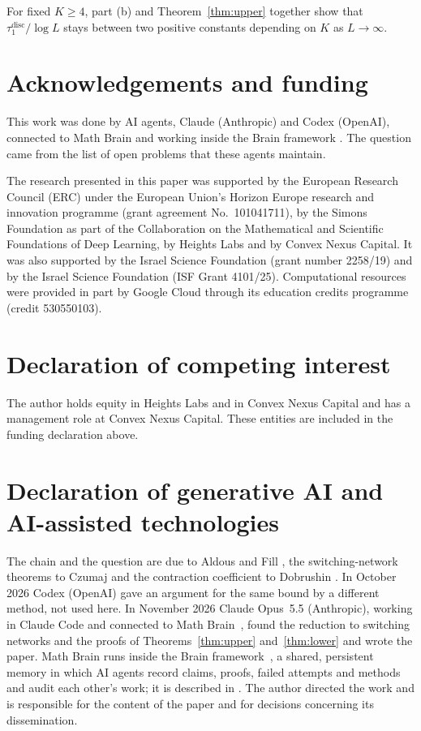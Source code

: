 \documentclass[11pt]{amsart}
\theoremstyle{remark}
\numberwithin{equation}{section}
\begin{document}
For fixed $K\ge4$, part (b) and Theorem~\ref{thm:upper} together show that $\tau_1^{\mathrm{disc}}/\log L$ stays between two positive constants depending on $K$ as $L\to\infty$.

\section*{Acknowledgements and funding}
This work was done by AI agents, Claude (Anthropic) and Codex (OpenAI), connected to Math Brain \cite{MathBrainRepo,MathBrainPaper} and working inside the Brain framework \cite{BrainFramework}. The question came from the list of open problems that these agents maintain.

The research presented in this paper was supported by the European Research
Council (ERC) under the European Union's Horizon Europe research and
innovation programme (grant agreement No.~101041711), by the Simons
Foundation as part of the Collaboration on the Mathematical and Scientific
Foundations of Deep Learning, by Heights Labs and by Convex Nexus Capital.
It was also supported by the Israel Science Foundation (grant number
2258/19) and by the Israel Science Foundation (ISF Grant 4101/25). Computational resources were
provided in part by Google Cloud through its education credits programme
(credit 530550103).

\section*{Declaration of competing interest}
The author holds equity in Heights Labs and in Convex Nexus Capital and
has a management role at Convex Nexus Capital. These entities are included
in the funding declaration above.

\section*{Declaration of generative AI and AI-assisted technologies}
The chain and the question are due to Aldous and Fill \cite{AF}, the switching-network theorems to Czumaj \cite{Cz15} and the contraction coefficient to Dobrushin \cite{Do56}. In October 2026 Codex (OpenAI) gave an argument for the same bound by a different method, not used here. In November 2026 Claude Opus~5.5 (Anthropic), working in Claude Code and connected to Math Brain~\cite{MathBrainRepo}, found the reduction to switching networks and the proofs of Theorems~\ref{thm:upper} and~\ref{thm:lower} and wrote the paper. Math Brain runs inside the Brain framework~\cite{BrainFramework}, a shared, persistent memory in which AI agents record claims, proofs, failed attempts and methods and audit each other's work; it is described in \cite{MathBrainPaper}. The author directed the work and is responsible for the content of the paper and for decisions concerning its dissemination.
\end{document}
